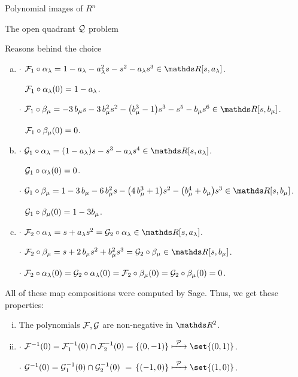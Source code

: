 \documentclass[11pt, a4paper, english, twoside, notitlepage]{report}
\begin{document}
\begin{chapter}{Polynomial images of $R^n$}
\begin{section}{The open quadrant $\mathcal{Q}$ problem}
\begin{subsection}{Reasons behind the choice}
		\begin{enumerate}[(a)]
		
			\item $\cdot$ $\F_1 \circ \alpha_\lambda = 1 -a_{\lambda}-a_{\lambda}^{2} s-s^{2}-a_{\lambda} s^{3} \in \R[s,a_{\lambda}]$.
			
				$\ \ \mathcal{F}_1\circ\alpha_{\lambda }(0)=1-a_{\lambda }$.
			
				$\cdot$ $\F_1\circ\beta_{\mu} = -3 \, b_{\mu} s - 3 \, b_{\mu}^{2} s^{2} - {\left(b_{\mu}^{3} - 1\right)} s^{3}-s^{5}-b_{\mu}s^{6} \in\R[s,b_{\mu}]$.
				
				$\ \ \F_1\circ\beta_{\mu}(0)=0$.
				
			\item $\cdot$ $ \G_1\circ\alpha_{\lambda } = {\left(1-a_{\lambda} \right)} s -s^{3} -a_{\lambda} s^{4} \in\R[s,a_{\lambda}]$.
			
				$\ \ \mathcal{G}_1\circ\alpha_{\lambda }(0)=0$.
			
				$\cdot$ $\G_1\circ\beta_{\mu} = 1-3 \, b_{\mu}-6 \, b_{\mu}^{2} s-{\left(4 \, b_{\mu}^{3} + 1\right)} s^{2}-{\left(b_{\mu}^{4} + b_{\mu}\right)} s^{3} \in\R[s,b_{\mu}]$.
				
				 $\ \ \G_1\circ\beta_{\mu}(0)=1-3b_{\mu}$.
		
			\item $\cdot$ $\F_2\circ\alpha_{\lambda }= s+a_{\lambda} s^{2} = \G_2\circ\alpha_{\lambda}\in\R[s,a_{\lambda }]$.
			
				$\cdot$ $\F_2\circ\beta_{\mu}= s+2 \, b_{\mu} s^{2}+b_{\mu}^{2} s^{3} = \G_2\circ\beta_{\mu}\in\R[s,b_{\mu}]$.
				
				$\cdot$ $\mathcal{F}_2\circ\alpha_{\lambda }(0)=\mathcal{G}_2\circ\alpha_{\lambda}(0)=\mathcal{F}_2\circ\beta_{\mu}(0)=\mathcal{G}_2\circ\beta_{\mu}(0)=0$.
		
		\end{enumerate}
		
		All of these map compositions were computed by Sage. Thus, we get these properties:
		
		\begin{enumerate}[(i)]
		
			\item The polynomials $\mathcal{F}, \mathcal{G}$ are non-negative in $\R^2$.
		
			\item $\cdot$ $\F^{-1}(0)=\F_1^{-1}(0)\cap \F_2^{-1}(0)= \{(0,-1)\} \xmapsto{\ \P\ } \set{(0,1)}$.
			
				 $\cdot$ $\G^{-1}(0)=\G_1^{-1}(0)\cap \G_2^{-1}(0)\ =\, \{(-1,0)\} \xmapsto{\ \P\ } \set{(1,0)}$.
		

\end{enumerate}
\end{subsection}
\end{section}
\end{chapter}
\end{document}
